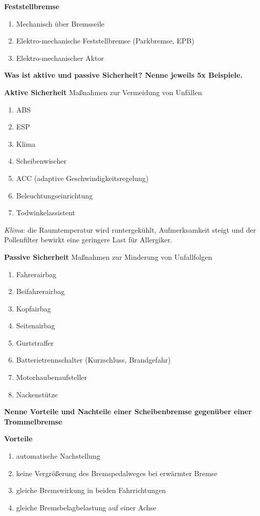 \textbf{Feststellbremse}

\begin{enumerate}
\item
  Mechanisch über Bremsseile
\item
  Elektro-mechanische Feststellbremse (Parkbremse, EPB)
\item
  Elektro-mechanischer Aktor
\end{enumerate}

\textbf{Was ist aktive und passive Sicherheit? Nenne jeweils 5x
Beispiele.}

\textbf{Aktive Sicherheit} Maßnahmen zur Vermeidung von Unfällen

\begin{enumerate}
\item
  ABS
\item
  ESP
\item
  Klima
\item
  Scheibenwischer
\item
  ACC (adaptive Geschwindigkeitsregelung)
\item
  Beleuchtungseinrichtung
\item
  Todwinkelassistent
\end{enumerate}

\emph{Klima}: die Raumtemperatur wird runtergekühlt, Aufmerksamkeit
steigt und der Pollenfilter bewirkt eine geringere Last für Allergiker.

\textbf{Passive Sicherheit} Maßnahmen zur Minderung von Unfallfolgen

\begin{enumerate}
\item
  Fahrerairbag
\item
  Beifahrerairbag
\item
  Kopfairbag
\item
  Seitenairbag
\item
  Gurtstraffer
\item
  Batterietrennschalter (Kurzschluss, Brandgefahr)
\item
  Motorhaubenaufsteller
\item
  Nackenstütze
\end{enumerate}

\textbf{Nenne Vorteile und Nachteile einer Scheibenbremse gegenüber
einer Trommelbremse}

\textbf{Vorteile}

\begin{enumerate}
\item
  automatische Nachstellung
\item
  keine Vergrößerung des Bremspedalweges bei erwärmter Bremse
\item
  gleiche Bremswirkung in beiden Fahrrichtungen
\item
  gleiche Bremsbelagbelastung auf einer Achse
\end{enumerate}

